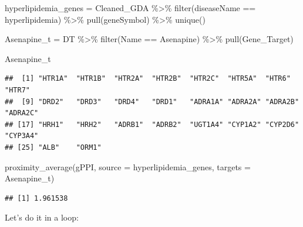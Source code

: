 \documentclass[
]{book}
\newenvironment{Shaded}{\begin{snugshade}}{\end{snugshade}}
\newcommand{\AttributeTok}[1]{\textcolor[rgb]{0.77,0.63,0.00}{#1}}
\newcommand{\FunctionTok}[1]{\textcolor[rgb]{0.00,0.00,0.00}{#1}}
\newcommand{\NormalTok}[1]{#1}
\newcommand{\OtherTok}[1]{\textcolor[rgb]{0.56,0.35,0.01}{#1}}
\newcommand{\SpecialCharTok}[1]{\textcolor[rgb]{0.00,0.00,0.00}{#1}}
\newcommand{\StringTok}[1]{\textcolor[rgb]{0.31,0.60,0.02}{#1}}
\begin{document}
\begin{Shaded}
\begin{Highlighting}[]
\NormalTok{hyperlipidemia\_genes }\OtherTok{=}\NormalTok{ Cleaned\_GDA }\SpecialCharTok{\%\textgreater{}\%} \FunctionTok{filter}\NormalTok{(diseaseName }\SpecialCharTok{==} \StringTok{\textquotesingle{}hyperlipidemia\textquotesingle{}}\NormalTok{) }\SpecialCharTok{\%\textgreater{}\%} \FunctionTok{pull}\NormalTok{(geneSymbol) }\SpecialCharTok{\%\textgreater{}\%} \FunctionTok{unique}\NormalTok{()}

\NormalTok{Asenapine\_t }\OtherTok{=}\NormalTok{ DT }\SpecialCharTok{\%\textgreater{}\%} 
  \FunctionTok{filter}\NormalTok{(Name }\SpecialCharTok{==} \StringTok{\textquotesingle{}Asenapine\textquotesingle{}}\NormalTok{) }\SpecialCharTok{\%\textgreater{}\%}
  \FunctionTok{pull}\NormalTok{(Gene\_Target)}

\NormalTok{Asenapine\_t}
\end{Highlighting}
\end{Shaded}

\begin{verbatim}
##  [1] "HTR1A"  "HTR1B"  "HTR2A"  "HTR2B"  "HTR2C"  "HTR5A"  "HTR6"   "HTR7"  
##  [9] "DRD2"   "DRD3"   "DRD4"   "DRD1"   "ADRA1A" "ADRA2A" "ADRA2B" "ADRA2C"
## [17] "HRH1"   "HRH2"   "ADRB1"  "ADRB2"  "UGT1A4" "CYP1A2" "CYP2D6" "CYP3A4"
## [25] "ALB"    "ORM1"
\end{verbatim}

\begin{Shaded}
\begin{Highlighting}[]
\FunctionTok{proximity\_average}\NormalTok{(gPPI, }
                  \AttributeTok{source =}\NormalTok{ hyperlipidemia\_genes, }
                  \AttributeTok{targets =}\NormalTok{ Asenapine\_t)}
\end{Highlighting}
\end{Shaded}

\begin{verbatim}
## [1] 1.961538
\end{verbatim}

Let's do it in a loop:
\end{document}
